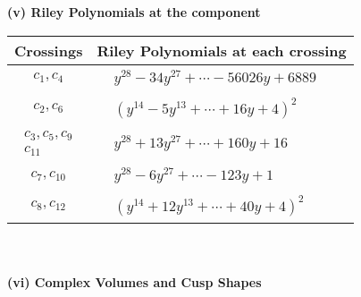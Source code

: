 \documentclass[1p]{elsarticle_modified}
\theoremstyle{definition}
\begin{document}
\newpage\renewcommand{\arraystretch}{1}
\flushleft \textbf{(v) Riley Polynomials at the component}\newline \\
\begin{tabular}{m{50pt}|m{274pt}}
Crossings & \hspace{64pt}Riley Polynomials at each crossing \\
\hline $$\begin{aligned}c_{1},c_{4}\end{aligned}$$&$\begin{aligned}
&y^{28}-34 y^{27}+\cdots-56026 y+6889
\end{aligned}$\\
\hline $$\begin{aligned}c_{2},c_{6}\end{aligned}$$&$\begin{aligned}
&(y^{14}-5 y^{13}+\cdots+16 y+4)^{2}
\end{aligned}$\\
\hline $$\begin{aligned}c_{3},c_{5},c_{9}\\c_{11}\end{aligned}$$&$\begin{aligned}
&y^{28}+13 y^{27}+\cdots+160 y+16
\end{aligned}$\\
\hline $$\begin{aligned}c_{7},c_{10}\end{aligned}$$&$\begin{aligned}
&y^{28}-6 y^{27}+\cdots-123 y+1
\end{aligned}$\\
\hline $$\begin{aligned}c_{8},c_{12}\end{aligned}$$&$\begin{aligned}
&(y^{14}+12 y^{13}+\cdots+40 y+4)^{2}
\end{aligned}$\\
\hline
\end{tabular}\\~\\
\newpage\flushleft \textbf{(vi) Complex Volumes and Cusp Shapes}
\end{document}
